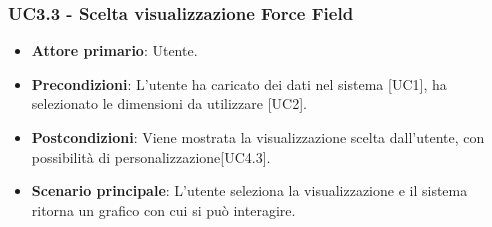 \subsubsection{UC3.3 - Scelta visualizzazione Force Field}
\begin{itemize}
	\item \textbf{Attore primario}: Utente.
	\item \textbf{Precondizioni}: L'utente ha caricato dei dati nel sistema [UC1], ha selezionato le dimensioni da utilizzare [UC2].
	\item \textbf{Postcondizioni}: Viene mostrata la visualizzazione  scelta dall'utente, con possibilità di personalizzazione[UC4.3].
	\item \textbf{Scenario principale}: L'utente seleziona la visualizzazione  e il sistema ritorna un grafico con cui si può interagire.
\end{itemize}